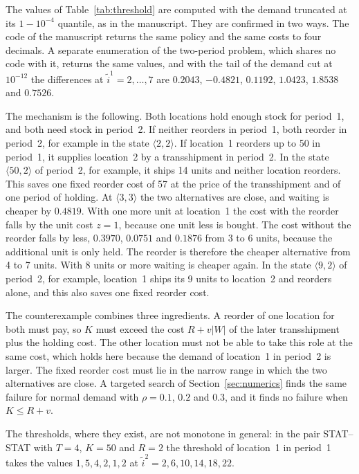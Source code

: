 \documentclass[11pt]{article}
\theoremstyle{definition}
\begin{document}
The values of Table~\ref{tab:threshold} are computed with the demand truncated at its $1-10^{-4}$ quantile, as in the manuscript. They are confirmed in two ways. The code of the manuscript returns the same policy and the same costs to four decimals. A separate enumeration of the two-period problem, which shares no code with it, returns the same values, and with the tail of the demand cut at $10^{-12}$ the differences at $\tilde{i}^1=2,\ldots,7$ are $0.2043$, $-0.4821$, $0.1192$, $1.0423$, $1.8538$ and $0.7526$.

The mechanism is the following. Both locations hold enough stock for period~1, and both need stock in period~2. If neither reorders in period~1, both reorder in period~2, for example in the state $\langle2,2\rangle$. If location~1 reorders up to 50 in period~1, it supplies location~2 by a transshipment in period~2. In the state $\langle50,2\rangle$ of period~2, for example, it ships 14 units and neither location reorders. This saves one fixed reorder cost of 57 at the price of the transshipment and of one period of holding. At $\langle3,3\rangle$ the two alternatives are close, and waiting is cheaper by $0.4819$. With one more unit at location~1 the cost with the reorder falls by the unit cost $z=1$, because one unit less is bought. The cost without the reorder falls by less, $0.3970$, $0.0751$ and $0.1876$ from 3 to 6 units, because the additional unit is only held. The reorder is therefore the cheaper alternative from 4 to 7 units. With 8 units or more waiting is cheaper again. In the state $\langle9,2\rangle$ of period~2, for example, location~1 ships its 9 units to location~2 and reorders alone, and this also saves one fixed reorder cost.

The counterexample combines three ingredients. A reorder of one location for both must pay, so $K$ must exceed the cost $R+v|W|$ of the later transshipment plus the holding cost. The other location must not be able to take this role at the same cost, which holds here because the demand of location~1 in period~2 is larger. The fixed reorder cost must lie in the narrow range in which the two alternatives are close. A targeted search of Section~\ref{sec:numerics} finds the same failure for normal demand with $\rho=0.1$, $0.2$ and $0.3$, and it finds no failure when $K\le R+v$.

The thresholds, where they exist, are not monotone in general: in the pair STAT--STAT with $T=4$, $K=50$ and $R=2$ the threshold of location~1 in period~1 takes the values $1,5,4,2,1,2$ at $\tilde{i}^2=2,6,10,14,18,22$.
\end{document}
